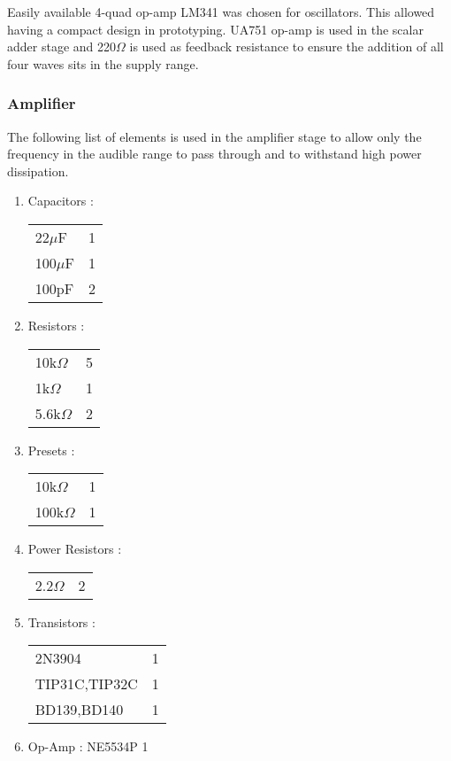 Easily available 4-quad op-amp LM341 was chosen for oscillators. This allowed having a compact design in prototyping. UA751 op-amp is used in the scalar adder stage and 220$\Omega$ is used as feedback resistance to ensure the addition of all four waves sits in the supply range.
\subsubsection*{Amplifier}
The following list of elements is used in the amplifier stage to allow only the frequency in the audible range to pass through and to withstand high power dissipation.
\begin{enumerate}
    \item Capacitors :
          \begin{tabular}{l r}
              22$\mu$F  & 1 \\
              100$\mu$F & 1 \\
              100pF     & 2 \\
          \end{tabular}
    \item Resistors :
          \begin{tabular}{l r}
              10k$\Omega$  & 5 \\
              1k$\Omega$   & 1 \\
              5.6k$\Omega$ & 2 \\
          \end{tabular}
    \item Presets :
          \begin{tabular}{l r}
              10k$\Omega$  & 1 \\
              100k$\Omega$ & 1 \\
          \end{tabular}
    \item Power Resistors :
          \begin{tabular}{l r}
              2.2$\Omega$ & 2 \\
          \end{tabular}
    \item Transistors :
          \begin{tabular}{l r}
              2N3904        & 1 \\
              TIP31C,TIP32C & 1 \\
              BD139,BD140   & 1 \\
          \end{tabular}
    \item Op-Amp : NE5534P   1
\end{enumerate}